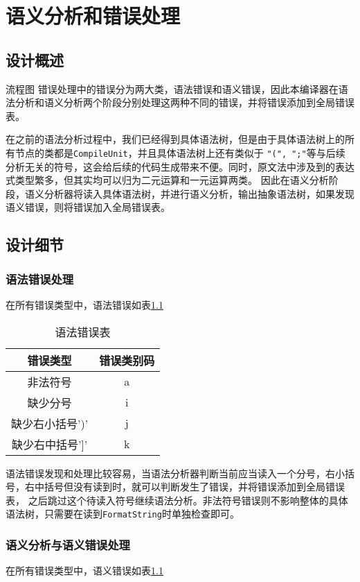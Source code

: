 \chapter{语义分析和错误处理}
\section{设计概述}

\todo 流程图
错误处理中的错误分为两大类，语法错误和语义错误，因此本编译器在语法分析和语义分析两个阶段分别处理这两种不同的错误，并将错误添加到全局错误表。

在之前的语法分析过程中，我们已经得到具体语法树，但是由于具体语法树上的所有节点的类都是\texttt{CompileUnit}，并且具体语法树上还有类似于
\texttt{"(", ";"}等与后续分析无关的符号，这会给后续的代码生成带来不便。同时，原文法中涉及到的表达式类型繁多，但其实均可以归为二元运算和一元运算两类。
因此在语义分析阶段，语义分析器将读入具体语法树，并进行语义分析，输出抽象语法树，如果发现语义错误，则将错误加入全局错误表。

\section{设计细节}
\subsection{语法错误处理}

在所有错误类型中，语法错误如表\ref{table:syntax}

\begin{table}[H] 
    \centering
    \begin{tabular}{cc}
    \toprule 
    错误类型 & 错误类别码  \\
    \midrule
    非法符号 & a  \\
    缺少分号 & i  \\
    缺少右小括号')' & j\\
    缺少右中括号']' & k \\
    \bottomrule %
    \end{tabular}
    \caption{语法错误表}
    \label{table:syntax}
\end{table}

语法错误发现和处理比较容易，当语法分析器判断当前应当读入一个分号，右小括号，右中括号但没有读到时，就可以判断发生了错误，并将错误添加到全局错误表，
之后跳过这个待读入符号继续语法分析。非法符号错误则不影响整体的具体语法树，只需要在读到\texttt{FormatString}时单独检查即可。
\subsection{语义分析与语义错误处理}
在所有错误类型中，语义错误如表\ref{table:syntax}

